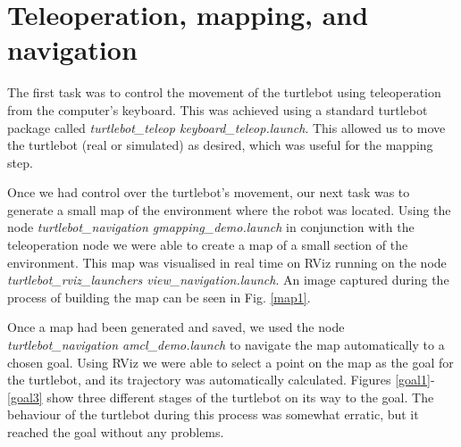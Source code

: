 \documentclass[11pt,oneside,a4paper]{article}
\begin{document}
\section{Teleoperation, mapping, and navigation}

The first task was to control the movement of the turtlebot using teleoperation from the computer's keyboard. This was achieved using a standard turtlebot package called \textit{turtlebot\_teleop keyboard\_teleop.launch}. This allowed us to move the turtlebot (real or simulated) as desired, which was useful for the mapping step.

Once we had control over the turtlebot's movement, our next task was to generate a small map of the environment where the robot was located. Using the node \textit{turtlebot\_navigation gmapping\_demo.launch} in conjunction with the teleoperation node we were able to create a map of a small section of the environment. This map was visualised in real time on RViz running on the node \textit{turtlebot\_rviz\_launchers view\_navigation.launch}. An image captured during the process of building the map can be seen in Fig. \ref{map1}.

Once a map had been generated and saved, we used the node \textit{turtlebot\_navigation amcl\_demo.launch} to navigate the map automatically to a chosen goal. Using RViz we were able to select a point on the map as the goal for the turtlebot, and its trajectory was automatically calculated. Figures \ref{goal1}-\ref{goal3} show three different stages of the turtlebot on its way to the goal. The behaviour of the turtlebot during this process was somewhat erratic, but it reached the goal without any problems.
\end{document}
